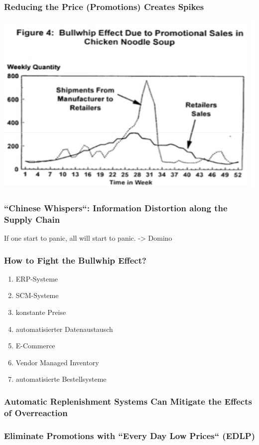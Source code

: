 \subsubsection{Reducing the Price (Promotions) Creates Spikes}
\includegraphics[width=1\textwidth]{W08/bullwhipnoodlesoup}
\subsubsection{``Chinese Whispers``: Information Distortion along the Supply Chain}
If one start to panic, all will start to panic. -> Domino
\subsubsection{How to Fight the Bullwhip Effect?}
\begin{enumerate}
	\item ERP-Systeme
	\item SCM-Systeme
	\item konstante Preise
	\item automatisierter Datenaustausch
	\item E-Commerce
	\item Vendor Managed Inventory
	\item automatisierte Bestellsysteme
\end{enumerate}
\subsubsection{ Automatic Replenishment Systems Can Mitigate the Effects of Overreaction}
\subsubsection{Eliminate Promotions with ``Every Day Low Prices`` (EDLP)}
